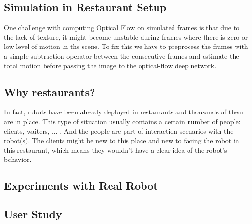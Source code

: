 \subsection{Simulation in Restaurant Setup}
One challenge with computing Optical Flow on simulated frames is that due to the lack of texture, it might become unstable during frames where there is zero or low level of motion in the scene. To fix this we have to preprocess the frames with a simple subtraction operator between the consecutive frames and estimate the total motion before passing the image to the optical-flow deep network.

\subsection{Why restaurants?}
\noindent

In fact, robots have been already deployed in restaurants and thousands of them are in place. This type of situation usually contains a certain number of people: clients, waiters, ... . And the people are part of interaction scenarios with the robot(s). The clients might be new to this place and new to facing the robot in this restaurant, which means they wouldn't have a clear idea of the robot's behavior. 



\subsection{Experiments with Real Robot}



\subsection{User Study}